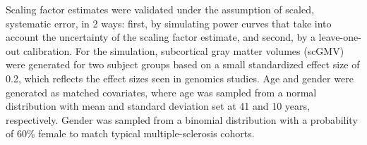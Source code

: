 Scaling factor estimates were validated under the assumption of scaled, systematic error, in 2 ways: first, by simulating power curves that take into account the uncertainty of the scaling factor estimate, and second, by a leave-one-out calibration. For the simulation, subcortical gray matter volumes (scGMV) were generated for two subject groups based on a small standardized effect size of 0.2, which reflects the effect sizes seen in genomics studies. Age and gender were generated as matched covariates, where age was sampled from a normal distribution with mean and standard deviation set at 41 and 10 years, respectively. Gender was sampled from a binomial distribution with a probability of 60\% female to match typical multiple-sclerosis cohorts. %